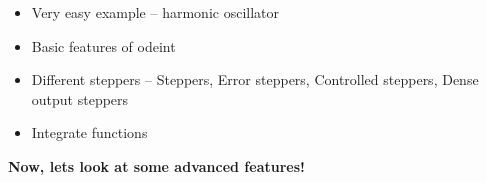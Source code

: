 \begin{frame}
 

 \vspace{2ex}
 \begin{itemize}
  \item Very easy example -- harmonic oscillator
  \item Basic features of odeint
  \item Different steppers -- Steppers, Error steppers, Controlled steppers, Dense output steppers
  \item Integrate functions
 \end{itemize}

 \vspace{2ex}

 \pause
 \centerline{\bf Now, lets look at some advanced features!}

\end{frame}



